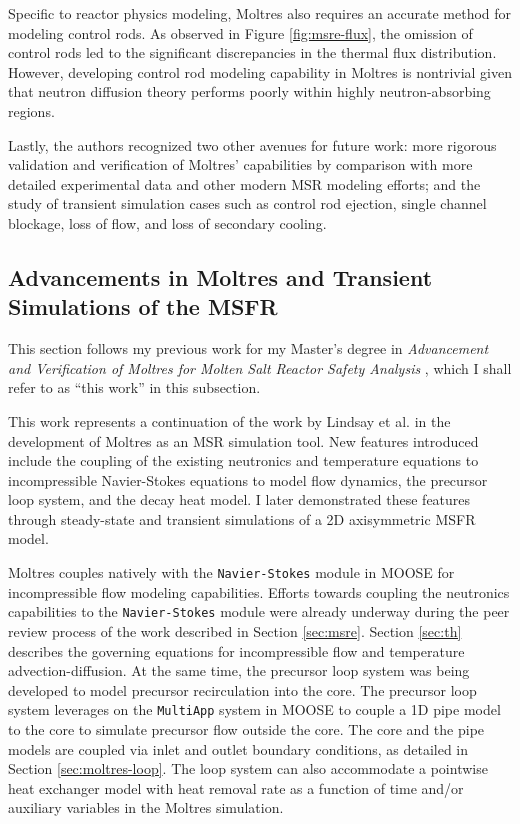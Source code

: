 Specific to reactor physics modeling, Moltres also requires an accurate method for modeling
control rods. As observed in Figure \ref{fig:msre-flux}, the omission of control rods led to the
significant discrepancies in the thermal flux distribution. However, developing control rod
modeling capability in Moltres is nontrivial given that neutron diffusion theory performs poorly
within highly neutron-absorbing regions.

Lastly, the authors recognized two other avenues for future work: more
rigorous validation and verification of Moltres' capabilities by comparison
with more detailed experimental data and other modern \gls{MSR} modeling
efforts; and the study of transient simulation cases such as control rod
ejection, single channel blockage, loss of flow, and loss of secondary cooling.

\subsection{Advancements in Moltres and Transient Simulations of the MSFR}
\label{sec:msfr}

This section follows my previous work for my Master's degree in \textit{Advancement and
Verification of Moltres for Molten Salt Reactor Safety Analysis} \cite{park_advancement_2020},
which I shall refer to as ``this work'' in this subsection.

This work represents a continuation of the work by Lindsay et al.
\cite{lindsay_introduction_2018} in the development of Moltres as an \gls{MSR}
simulation tool. New features introduced include the coupling of the existing
neutronics and temperature equations to incompressible Navier-Stokes equations
to model flow dynamics, the precursor loop system, and the decay heat model.
I later demonstrated these features through steady-state and transient
simulations of a 2D axisymmetric \gls{MSFR} model.

Moltres couples natively with the \texttt{Navier-Stokes} module in \gls{MOOSE} for
incompressible flow modeling capabilities. Efforts towards coupling
the neutronics capabilities to the \texttt{Navier-Stokes} module were already
underway during the peer review process of the work described in Section
\ref{sec:msre}. Section \ref{sec:th} describes the governing equations for
incompressible flow and temperature advection-diffusion. At the same time,
the precursor loop system was being developed to model
precursor recirculation into the core. The precursor loop system leverages on
the \texttt{MultiApp} system in \gls{MOOSE} to couple a 1D pipe model to the
core to simulate precursor flow outside the core. The core and the pipe models
are coupled via inlet and outlet boundary conditions, as detailed in Section
\ref{sec:moltres-loop}. The loop system can also accommodate a pointwise heat
exchanger model with heat removal rate as a function of time
and/or auxiliary variables in the Moltres simulation.

